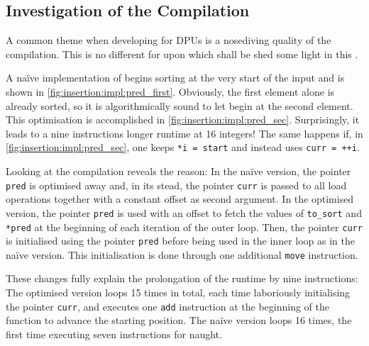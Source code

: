 \subsection*{Investigation of the Compilation}
\label{sec:tasklet:insertion:compilation}

A common theme when developing for DPUs is a nosediving quality of the compilation.
This is no different for \IS{} upon which shall be shed some light in this .

A naïve implementation of \IS{} begins sorting at the very start of the input and is shown in \cref{fig:insertion:impl:pred_first}.
Obviously, the first element alone is already sorted, so it is algorithmically sound to let \IS{} begin at the second element.
This optimisation is accomplished in \cref{fig:insertion:impl:pred_sec}.
Surprisingly, it leads to a nine instructions longer runtime at 16 integers!
The same happens if, in \cref{fig:insertion:impl:pred_sec}, one keeps \lstinline|*i = start| and instead uses \lstinline|curr = ++i|.

Looking at the compilation reveals the reason:
In the naïve version, the pointer \lstinline|pred| is optimised away and, in its stead, the pointer \lstinline|curr| is passed to all load operations together with a constant offset as second argument.
In the optimised version, the pointer \lstinline|pred| is used with an offset to fetch the values of \lstinline|to_sort| and \lstinline|*pred| at the beginning of each iteration of the outer loop.
Then, the pointer \lstinline|curr| is initialised using the pointer \lstinline|pred| before being used in the inner loop as in the naïve version.
This initialisation is done through one additional \lstinline|move| instruction.

These changes fully explain the prolongation of the runtime by nine instructions:
The optimised version loops 15 times in total, each time laboriously initialising the pointer \lstinline|curr|, and executes one \lstinline|add| instruction at the beginning of the function to advance the starting position.
The naïve version loops 16 times, the first time executing seven instructions for naught.


